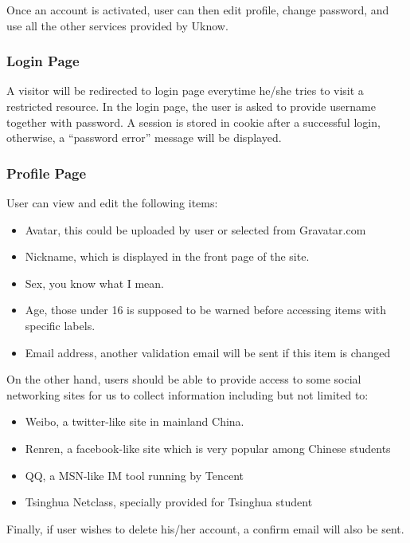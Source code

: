 Once an account is activated, user can then edit profile, change
password, and use all the other services provided by Uknow.

\subsubsection{Login Page}

A visitor will be redirected to login page everytime he/she tries to
visit a restricted resource. In the login page, the user is asked to
provide username together with password. A session is stored in cookie
after a successful login, otherwise, a ``password error'' message will
be displayed.

\subsubsection{Profile Page}

User can view and edit the following items:

\begin{itemize}
\itemsep1pt\parskip0pt
\item
  Avatar, this could be uploaded by user or selected from Gravatar.com
\item
  Nickname, which is displayed in the front page of the site.
\item
  Sex, you know what I mean.
\item
  Age, those under 16 is supposed to be warned before accessing items
  with specific labels.
\item
  Email address, another validation email will be sent if this item is
  changed
\end{itemize}

On the other hand, users should be able to provide access to some social
networking sites for us to collect information including but not limited
to:

\begin{itemize}
\itemsep1pt\parskip0pt
\item
  Weibo, a twitter-like site in mainland China.
\item
  Renren, a facebook-like site which is very popular among Chinese
  students
\item
  QQ, a MSN-like IM tool running by Tencent
\item
  Tsinghua Netclass, specially provided for Tsinghua student
\end{itemize}

Finally, if user wishes to delete his/her account, a confirm email will
also be sent.

